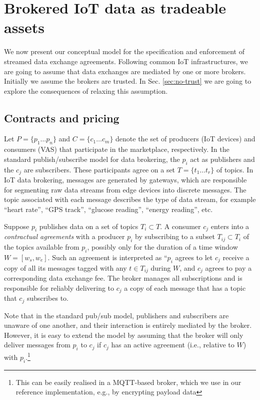 \documentclass[chi_draft]{sigchi}
\begin{document}
\section{Brokered IoT data as tradeable assets}

We now present our conceptual model for the specification and enforcement of streamed data exchange agreements.
%
Following common IoT infrastructures, we are going to assume that data exchanges are mediated by one or more brokers.
Initially we assume the brokers are trusted. In Sec. \ref{sec:no-trust} we are going to explore the consequences of relaxing this assumption.

\subsection{Contracts and pricing}

Let  $P = \{p_1 \dots p_n \}$ and $C = \{ c_1 \dots c_m \}$ denote the set of producers (IoT devices) and consumers (VAS) that participate in the marketplace, respectively.
%
In the standard publish/subscribe model for data brokering, the $p_i$ act as publishers and the $c_j$ are subscribers.
These participants agree on a set $T = \{ t_1 \dots t_r \}$ of topics.
In IoT data brokering, messages are generated by gateways, which are responsible for segmenting raw data streams from edge devices into discrete messages.
The topic associated with each message describes the type of data stream, for example ``heart rate'', ``GPS track'', ``glucose reading'', ``energy reading'', etc.

Suppose $ p_i $ publishes data on a set of topics $T_{i} \subset T$.
A consumer $ c_j  $ enters into a \textit{contractual agreements} with a producer $ p_i  $ by subscribing to a subset $T_{ij} \subset T_i$ of the topics available from $p_i$, possibly only for the duration of a time window $ W = [w_s, w_e] $.
Such an agreement is interpreted as ``$p_i$ agrees to let $c_j$ receive a copy of all its messages tagged with any $t \in T_{ij}$ during $W$, and $c_j$ agrees to pay a corresponding data exchange fee. 
The broker manages all subscriptions and is responsible for reliably delivering to $ c_j  $ a copy of each message that has a topic that $ c_j $ subscribes to.

Note that in the standard pub/sub model, publishers and subscribers are unaware of one another, and their interaction is entirely mediated by the broker. 
However, it is easy to extend the model by assuming that the broker will only deliver messages from $ p_i $ to $ c_j $ if $ c_j $ has an active agreement (i.e., relative to $W$) with $ p_i $.\footnote{This can be easily realised in a MQTT-based broker, which we use in our reference implementation, e.g., by encrypting payload data}
\end{document}
